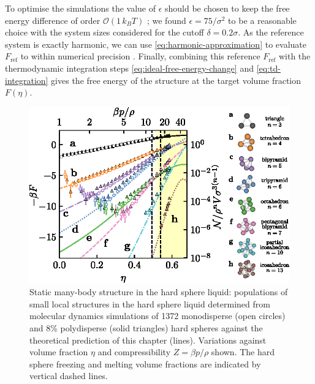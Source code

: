 \documentclass[11pt,twoside]{report}
\begin{document}
To optimise the simulations the value of $\epsilon$ should be chosen to keep the free energy difference of order $\mathcal{O}(1 \, k_B T)$ \cite{SchillingJCP2009}; we found $\epsilon = 75/\sigma^2$ to be a reasonable choice with the system sizes considered for the cutoff $\delta = 0.2\sigma$.
As the reference system is exactly harmonic, we can use \eqref{eq:harmonic-approximation} to evaluate $F_\mathrm{ref}$ to within numerical precision%
.
Finally, combining this reference $F_\mathrm{ref}$ with the thermodynamic integration steps \eqref{eq:ideal-free-energy-change} and \eqref{eq:td-integration} gives the free energy of the structure at the target volume fraction $F(\eta)$.

\begin{figure}
  \includegraphics[width=\linewidth,center]{structure-populations}
  \caption[Concentration of local structures in the equilibrium liquid]{
    Static many-body structure in the hard sphere liquid: populations of small local structures in the hard sphere liquid determined from molecular dynamics simulations of 1372 monodisperse (open circles) and 8\% polydisperse (solid triangles) hard spheres against the theoretical prediction of this chapter (lines).
    Variations against volume fraction $\eta$ and compressibility $Z = \beta p/\rho$ shown.
    The hard sphere freezing and melting volume fractions are indicated by vertical dashed lines.
  }
  \label{fig:structure-populations}
\end{figure}
\end{document}

